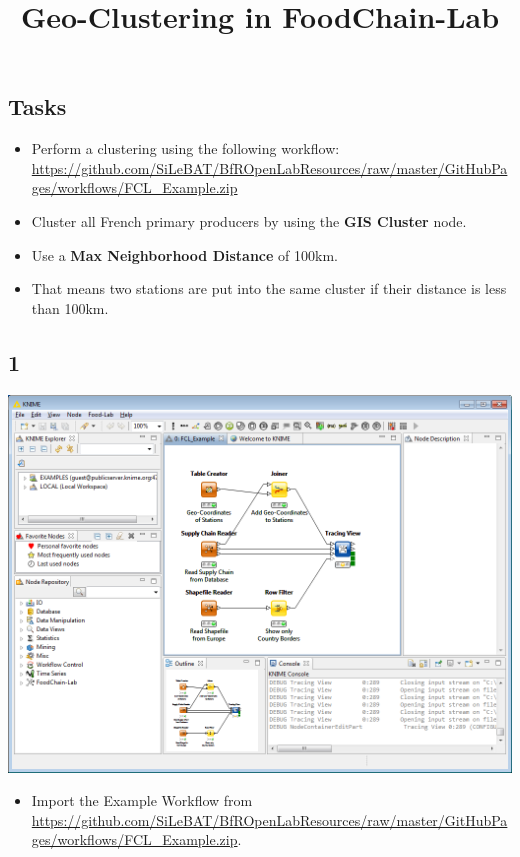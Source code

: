\documentclass{beamer}
\title{Geo-Clustering in FoodChain-Lab}
\date{}
\begin{document}
\maketitle

\section{ }

\subsection{Tasks}
\begin{frame}
	\begin{itemize}
		\item Perform a clustering using the following workflow: \url{https://github.com/SiLeBAT/BfROpenLabResources/raw/master/GitHubPages/workflows/FCL_Example.zip}
		\item Cluster all French primary producers by using the \textbf{GIS Cluster} node.
		\item Use a \textbf{Max Neighborhood Distance} of 100km.
		\item That means two stations are put into the same cluster if their distance is less than 100km.
	\end{itemize}
\end{frame}
 
\subsection{1}
\begin{frame}
	\begin{center}
  		\includegraphics[height=0.6\textheight]{1.png}
	\end{center}
	\begin{itemize}
		\item Import the Example Workflow from \url{https://github.com/SiLeBAT/BfROpenLabResources/raw/master/GitHubPages/workflows/FCL_Example.zip}.
	\end{itemize}
\end{frame}
\end{document}
